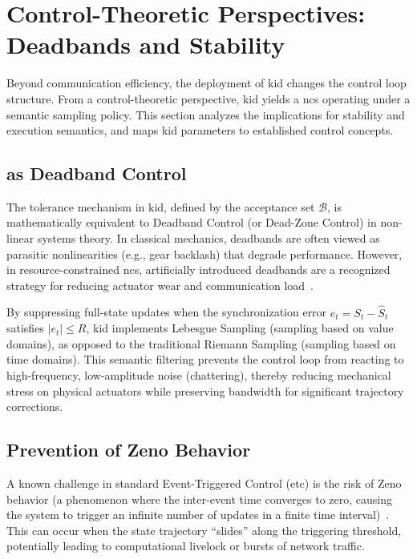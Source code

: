 \section{Control-Theoretic Perspectives: Deadbands and Stability}
\label{sec:control_theory}

Beyond communication efficiency, the deployment of \gls{kid} changes the control loop structure. From a control-theoretic perspective, \gls{kid} yields a \gls{ncs} operating under a semantic sampling policy. This section analyzes the implications for stability and execution semantics, and maps \gls{kid} parameters to established control concepts.

\subsection[K-ID as Deadband Control]{ as Deadband Control}
The tolerance mechanism in \gls{kid}, defined by the acceptance set $\mathcal{B}$, is mathematically equivalent to Deadband Control (or Dead-Zone Control) in non-linear systems theory. In classical mechanics, deadbands are often viewed as parasitic nonlinearities (e.g., gear backlash) that degrade performance. However, in resource-constrained \gls{ncs}, artificially introduced deadbands are a recognized strategy for reducing actuator wear and communication load~\cite{astrom2002comparison}.

By suppressing full-state updates when the synchronization error $e_t = S_t - \hat{S}_t$ satisfies $|e_t| \le R$, \gls{kid} implements Lebesgue Sampling (sampling based on value domains), as opposed to the traditional Riemann Sampling (sampling based on time domains). This semantic filtering prevents the control loop from reacting to high-frequency, low-amplitude noise (chattering), thereby reducing mechanical stress on physical actuators while preserving bandwidth for significant trajectory corrections.

\subsection{Prevention of Zeno Behavior}
A known challenge in standard Event-Triggered Control (\gls{etc}) is the risk of Zeno behavior (a phenomenon where the inter-event time converges to zero, causing the system to trigger an infinite number of updates in a finite time interval)~\cite{heemels2012introduction}. This can occur when the state trajectory ``slides'' along the triggering threshold, potentially leading to computational livelock or bursts of network traffic.

